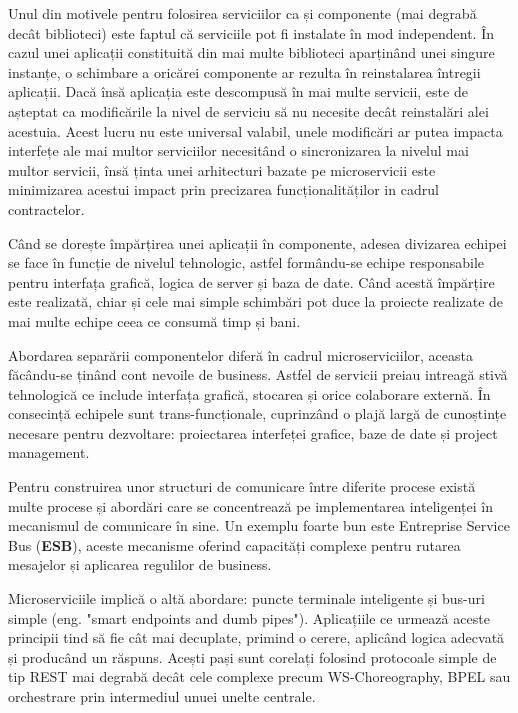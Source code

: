 \documentclass[12pt, a4paper, oneside, romanian]{teza-upb}
\begin{document}
Unul din motivele pentru folosirea serviciilor ca și componente (mai degrabă decât biblioteci) este faptul că serviciile pot fi instalate în mod independent. În cazul unei aplicații constituită din mai multe biblioteci aparținând unei singure instanțe, o schimbare a oricărei componente ar rezulta în reinstalarea întregii aplicații. Dacă însă aplicația este descompusă în mai multe servicii, este de așteptat ca modificările la nivel de serviciu să nu necesite decât reinstalări alei acestuia. Acest lucru nu este universal valabil, unele modificări ar putea impacta interfețe ale mai multor serviciilor necesitând o sincronizarea la nivelul mai multor servicii, însă ținta unei arhitecturi bazate pe microservicii este minimizarea acestui impact prin precizarea funcționalităților in cadrul contractelor.

Când se dorește împărțirea unei aplicații în componente, adesea divizarea echipei se face în funcție de nivelul tehnologic, astfel formându-se echipe responsabile pentru interfața grafică, logica de server și baza de date. Când acestă împărțire este realizată, chiar și cele mai simple schimbări pot duce la proiecte realizate de mai multe echipe ceea ce consumă timp și bani.

Abordarea separării componentelor diferă în cadrul microserviciilor, aceasta făcându-se ținând cont nevoile de business. Astfel de servicii preiau intreagă stivă tehnologică ce include interfața grafică, stocarea și orice colaborare externă. În consecință echipele sunt trans-funcționale, cuprinzând o plajă largă de cunoștințe necesare pentru dezvoltare: proiectarea interfeței grafice, baze de date și project management. 

Pentru construirea unor structuri de comunicare între diferite procese există multe procese și abordări care se concentrează pe implementarea inteligenței în mecanismul de comunicare în sine. Un exemplu foarte bun este Entreprise Service Bus (\textbf{ESB}), aceste mecanisme oferind capacități complexe pentru rutarea mesajelor și aplicarea regulilor de business.

Microserviciile implică o altă abordare: puncte terminale inteligente și bus-uri simple (eng. "smart endpoints and dumb pipes"). Aplicațiile ce urmează aceste principii tind să fie cât mai decuplate, primind o cerere, aplicând logica adecvată și producând un răspuns. Acești pași sunt corelați folosind protocoale simple de tip REST mai degrabă decât cele complexe precum WS-Choreography, BPEL sau orchestrare prin intermediul unuei unelte centrale. 
\end{document}
